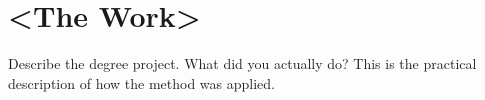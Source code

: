 \section{<The Work> }
Describe the degree project. What did you actually do? This is the practical description of how the method was applied.
